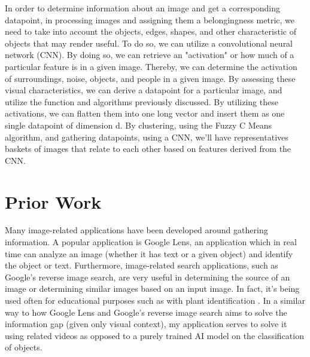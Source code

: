 \documentclass[10pt,twocolumn]{article}
\begin{document}

In order to determine information about an image and get a corresponding datapoint, in processing images and assigning them a belongingness metric, we need to take into account the objects, edges, shapes, and other characteristic of objects that may render useful. To do so, we can utilize a convolutional neural network (CNN). By doing so, we can retrieve an "activation" or how much of a particular feature is in a given image. Thereby, we can determine the activation of surroundings, noise, objects, and people in a given image. By assessing these visual characteristics, we can derive a datapoint for a particular image, and utilize the function and algorithms previously discussed. By utilizing these activations, we can flatten them into one long vector and insert them as one single datapoint of dimension d. By clustering, using the Fuzzy C Means algorithm, and gathering datapoints, using a CNN, we'll have representatives baskets of images that relate to each other based on features derived from the CNN. 


\section{Prior Work}

Many image-related applications have been developed around gathering information. A popular application is Google Lens, an application which in real time can analyze an image (whether it has text or a given object) and identify the object or text. Furthermore, image-related search applications, such as Google’s reverse image search, are very useful in determining the source of an image or determining similar images based on an input image. In fact, it’s being used often for educational purposes such as with plant identification \cite{Moore2018}. In a similar way to how Google Lens and Google’s reverse image search aims to solve the information gap (given only visual context), my application serves to solve it using related videos as opposed to a purely trained AI model on the classification of objects.
\end{document}
